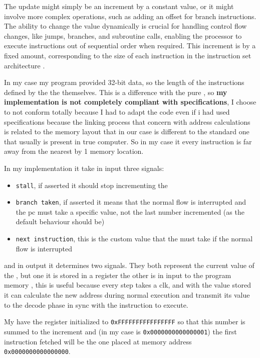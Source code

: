 \documentclass{article}
\begin{document}
    The update might simply be an increment by a constant value, or it might involve more complex operations, such as adding an offset for branch instructions. The ability to change the \PC value dynamically is crucial for handling control flow changes, like jumps, branches, and subroutine calls, enabling the processor to execute instructions out of sequential order when required.
    This increment is by a fixed amount, corresponding to the size of each instruction in the instruction set architecture \cite{chatgpt}.
    
    In my case my program \RAM provided 32-bit data, so the length of the instructions defined by the the \ISA themselves. This is a difference with the pure \RISCV \ISA, so \textbf{my implementation is not completely compliant with \RISCV specifications}, I choose to not conform totally because I had to adapt the code even if i had used \RISCV specifications because the \gls{linking} process that concern with address calculations is related to the memory layout that in our case is different to the standard one that usually is present in true computer.
    So in my case it every instruction is far away from the nearest by 1 memory location.

    In my implementation it take in input three signals:
    \begin{itemize}
        \item \texttt{stall},
            if asserted it should stop incrementing the \PC
        \item \texttt{branch taken},
            if asserted it means that the normal flow is interrupted and the \acrlong{pc} must take a specific value, not the last number incremented (as the default behaviour should be)
        \item \texttt{next instruction},
            this is the custom value that the \PC must take if the normal flow is interrupted
    \end{itemize}
    and in output it determines two signals. They both represent the current value of the \PC, but one it is stored in a register the other is in input to the program memory , this is useful because every step takes a \gls{clk}, and with the value stored it can calculate the new address during normal execution and transmit its value to the decode phase  in sync with the instruction to execute.

    My \PC have the register initialized to \texttt{0xFFFFFFFFFFFFFFFF} so that this number is summed to the increment and (in my case is \texttt{0x0000000000000001}) the first instruction fetched will be the one placed at memory address \texttt{0x0000000000000000}.
\end{document}
